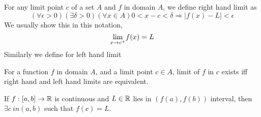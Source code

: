\begin{definition} For any limit point $c$ of a set $A$ and $f$ in domain $A$, we define right hand limit as
    \[ (\forall \epsilon >0) (\exists \delta > 0)(\forall x \in A) 0 < x-c < \delta \Rightarrow |f(x) - L| < \epsilon\]
    We usually show this in this notation,
    \[ \underset{x \to c^{+}}{\lim} f(x) = L\]
    Similarly we define for left hand limit
\end{definition}

\begin{theorem} For a function $f$ in domain $A$, and a limit point $c \in A$, limit of $f$ in $c$ exists iff  right hand and left hand limits are equivalent.
\end{theorem}



\begin{theorem} If $f: [a,b] \to {\mathbb{R}}$ is continuous and $L \in {\mathbb{R}}$ lies in $(f(a), f(b))$ interval, then $\exists c\ in (a,b)$ such that $f(c) = L$.
\end{theorem}


